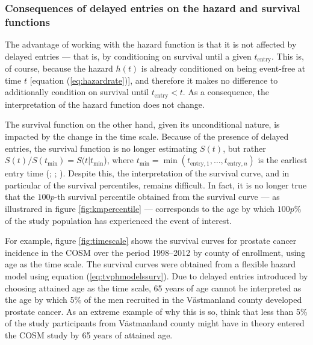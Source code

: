 \subsubsection{Consequences of delayed entries on the hazard and survival functions}
The advantage of working with the hazard function is that it is not affected by delayed entries  --- that is, by conditioning on survival until a given $t_{\textrm{entry}}$. This is, of course, because the hazard $h(t)$ is already conditioned on being event-free at time $t$ [equation (\ref{eq:hazardrate})], and therefore it makes no difference to additionally condition on survival until $t_{\textrm{entry}}<t$. As a consequence, the interpretation of the hazard function does not change.


The survival function on the other hand, given its unconditional nature, is impacted by the change in the time scale. Because of the presence of delayed entries, the survival function is no longer estimating $S(t)$, but rather $S(t)/S(t_{\min})=S(t|t_{\min}$), where $t_{\min}=\min(t_{\textrm{entry},1},\ldots,t_{\textrm{entry},n})$ is the earliest entry time (\citealp[section~3.5.1]{lawless_statistical_2003}; \citealp[section~8.2.3]{cleves_introduction_2010}; \citealp{mackenzie_survival_2012}). Despite this, the interpretation of the survival curve, and in particular of the survival percentiles, remains difficult. In fact, it is no longer true that the $100p$-th survival percentile obtained from the survival curve  --- as illustrared in figure \ref{fig:kmpercentile} --- corresponds to the age by which $100p\%$ of the study population has experienced the event of interest. 

For example, figure \ref{fig:timescale} shows the survival curves for prostate cancer incidence in the COSM over the period 1998--2012 by county of enrollment, using age as the time scale. The survival curves were obtained from a flexible hazard model using equation (\ref{eq:tvphmodelssurv}). Due to delayed entries introduced by choosing attained age as the time scale, 65 years of age cannot be interpreted as the age by which 5\% of the men recruited in the Västmanland county developed prostate cancer. As an extreme example of why this is so, think that less than 5\% of the study participants from Västmanland county might have in theory entered the COSM study by 65 years of attained age.

